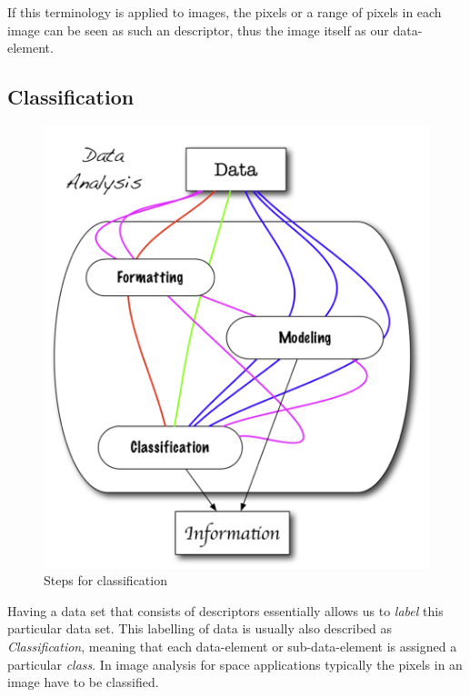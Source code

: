 If this terminology is applied to images, the pixels or a range of pixels in each image can be seen as such an descriptor, thus the image itself as our data-element.

\subsection{Classification}
\begin{figure}[h!]
	\centering
	\includegraphics[width=\textwidth/2-5em]{images/data_analysis.png}
	\caption{Steps for classification \protect\footnotemark}
	\label{fig:data_anal}
\end{figure}
Having a data set that consists of descriptors essentially allows us to \textit{label} this particular data set. This labelling of data is usually also described as \textit{Classification}, meaning that each data-element or sub-data-element is assigned a particular \textit{class}. In image analysis for space applications typically the pixels in an image have to be classified.

